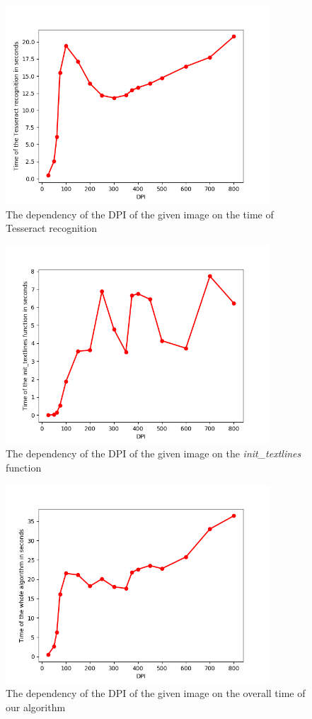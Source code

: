 \begin{figure}
\centering
\includegraphics[height=20em]{img/results/dpiTimeTesseract.png}
\caption{The dependency of the DPI of the given image on the time of Tesseract recognition}
\label{fig:dpiSpeed}
\end{figure}

\begin{figure}
\centering
\includegraphics[height=20em]{img/results/dpiTimeInit.png}
\caption{The dependency of the DPI of the given image on the \emph{init\_textlines} function}
\label{fig:dpiSpeed}
\end{figure}

\begin{figure}
\centering
\includegraphics[height=20em]{img/results/dpiTimeAll.png}
\caption{The dependency of the DPI of the given image on the overall time of our algorithm}
\label{fig:dpiSpeed}
\end{figure}

